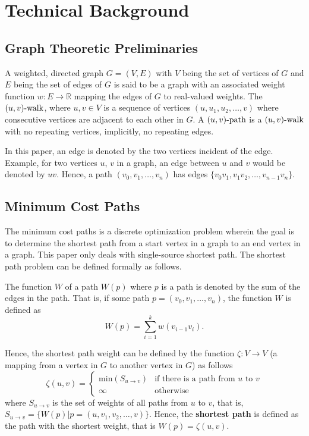 \chapter{Technical Background}

\section{Graph Theoretic Preliminaries}
A weighted, directed graph $G=(V,E)$ with $V$ being the set of vertices of $G$ and $E$ being the set 
of edges of $G$ is said to be a graph with an associated weight function $w:E\to\mathbb{R}$ mapping the edges of $G$
to real-valued weights. The $(u, v)\text{-walk}$, where $u,v\in V$ is a sequence of vertices $(u, u_1, u_2,\dots,v)$ where 
consecutive vertices are adjacent to each other in $G$. A $(u, v)\text{-path}$ is a $(u, v)\text{-walk}$ with no repeating vertices,
implicitly, no repeating edges.

In this paper, an edge is denoted by the two vertices incident of the edge. Example, for two vertices $u$, $v$ in a graph, 
an edge between $u$ and $v$ would be denoted by $uv$. Hence, a path $(v_0, v_1, \dots, v_n)$ has edges
$\{v_0v_1, v_1v_2,\dots, v_{n-1}v_n\}$. 

\section{Minimum Cost Paths}
The minimum cost paths is a discrete optimization problem wherein the goal is to determine 
the shortest path from a start vertex in a graph to an end vertex in a graph. This paper only 
deals with single-source shortest path. The shortest path problem can be defined formally as follows.

The function $W$ of a path $W(p)$ where $p$ is a path is denoted by the sum of the edges 
in the path.\cite{CLRS} That is, if some path $p=(v_0, v_1, \dots, v_n)$, the function $W$ is defined as 
\[
W(p) = \sum^k_{i=1} w(v_{i-1}v_i). 
\]

Hence, the shortest path weight can be defined by the function $\zeta: V\to V$ (a mapping from a vertex in $G$ to another vertex in $G$)
as follows 
\[
\zeta(u, v)=\begin{cases}
    \text{min}(S_{u\to v}) & \text{if there is a path from $u$ to $v$} \\ 
    \infty  & \text{otherwise}
\end{cases}    
\]
where $S_{u\to v}$ is the set of weights of all paths from $u$ to $v$, that is, $S_{u\to v}=\{W(p) | p=(u,v_1, v_2,\dots, v)\}$.
Hence, the \textbf{shortest path} is defined as the path with the shortest weight, that is $W(p)=\zeta(u, v)$.\cite{CLRS}

